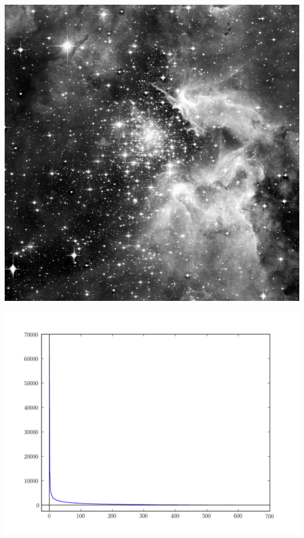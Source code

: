 \begin{center}
\includegraphics[scale=.2]{./Figures/hubble_red.png}

\includegraphics[scale=.4]{./Figures/hubble_svals.pdf}
\end{center}

